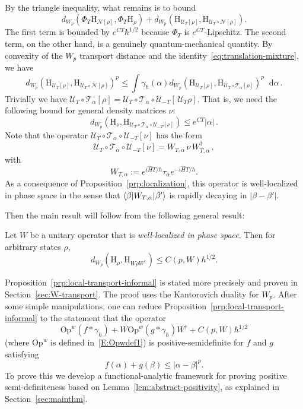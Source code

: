 \documentclass[11pt]{amsart}
\def\Husimi{{\mathrm{H}}}
\def\Op{\mathrm{Op}}
\newcommand{\diff}{\mathop{}\!\mathrm{d}}
\newcommand{\mcal}[1]{{\mathcal{#1}}}
\def\braket#1{\mathinner{\langle{#1}\rangle}}
\numberwithin{equation}{section}
\begin{document}
By the triangle inequality, what remains is to bound
\[
d_{W_p}(\Phi_T \Husimi_{\mcal{N}[\rho]}, \Phi_T \Husimi_\rho)
+ d_{W_p} (\Husimi_{\mcal{U}_T[\rho]}, \Husimi_{\mcal{U}_T\circ\mcal{N}[\rho]}).
\]
The first term is bounded by $e^{CT}\hbar^{1/2}$ because $\Phi_T$ is $e^{CT}$-Lipschitz.
The second term, on the other hand, is a genuinely quantum-mechanical quantity.  By convexity of the $W_p$ transport
distance and the identity~\eqref{eq:translation-mixture}, we have
\[
d_{W_p}( \Husimi_{\mcal{U}_T[\rho]}, \Husimi_{\mcal{U}_T\circ \mcal{N}[\rho]})^p
\leq \int \gamma_\hbar(\alpha)
d_{W_p}( \Husimi_{\mcal{U}_T[\rho]}, \Husimi_{\mcal{U}_T\circ \mcal{T}_\alpha[\rho]})^p \diff \alpha\,.
\]
Trivially we have $\mcal{U}_T\circ \mcal{T}_\alpha[\rho] = \mcal{U}_T\circ \mcal{T}_\alpha \circ \mcal{U}_{-T}
[\,\mcal{U}_T\rho]$.  That is, we need the following bound for general density matrices $\nu$:
\[
d_{W_p}(\Husimi_{\nu}, \Husimi_{\mcal{U}_T\circ\mcal{T}_\alpha\circ\mcal{U}_{-T}[\nu]}) \leq e^{CT}|\alpha|\,.
\]
Note that the operator $\mcal{U}_T\circ\mcal{T}_\alpha\circ\mcal{U}_{-T}[\nu]$ has the form
\[
\mcal{U}_T\circ\mcal{T}_\alpha\circ\mcal{U}_{-T}[\nu] = W_{T,\alpha} \,\nu\, W_{T,\alpha}^\dagger\,,
\]
with
\[
W_{T,\alpha} := e^{i\hat{H}T/\hbar} \tau_\alpha e^{-i\hat{H}T/\hbar}.
\]
As a consequence of Proposition~\ref{prp:localization}, this operator is well-localized in phase space in the sense that $\braket{\beta | W_{T,\alpha}|\beta'}$ is rapidly decaying in $|\beta-\beta'|$.

Then the main result will follow from the following general result:
\begin{proposition}
\label{prp:local-transport-informal}
Let $W$ be a unitary operator that is \textit{well-localized in phase space}.  Then for
arbitrary states $\rho$,
\[
d_{W_p}(\Husimi_\rho, \Husimi_{W\rho W^\dagger}) \leq C(p,W) \hbar^{1/2}.
\]
\end{proposition}
Proposition~\ref{prp:local-transport-informal} is stated more precisely and proven in Section~\ref{sec:W-transport}.
The proof uses the Kantorovich duality
for $W_p$.  After some simple manipulations, one can reduce Proposition~\ref{prp:local-transport-informal} to the statement
that the operator
\[
\Op^w(f\ast \gamma_\hbar) + W\Op^w(g\ast \gamma_\hbar)W^\dagger + C(p,W)\hbar^{1/2}
\]
(where $\Op^w$ is defined in~\eqref{E:Opwdef1}) is positive-semidefinite for $f$ and $g$ satisfying
\[
f(\alpha) + g(\beta) \leq |\alpha-\beta|^p.
\]
To prove this we develop a functional-analytic framework for proving positive semi-definiteness based on Lemma~\ref{lem:abstract-positivity}, as  explained in Section~\ref{sec:mainthm}.
\end{document}
